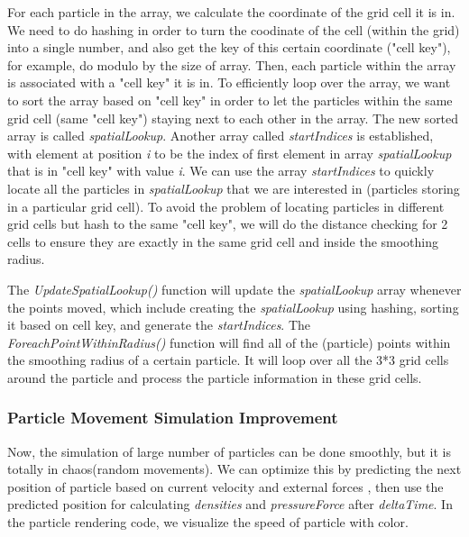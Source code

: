 \documentclass{article}
\begin{document}
For each particle in the array, we calculate the coordinate of the grid cell it is in. We need to do hashing in order to turn the coodinate of the cell (within the grid) into a single number, and also get the key of this certain coordinate ("cell key"), for example, do modulo by the size of array. Then, each particle within the array is associated with a "cell key" it is in. To efficiently loop over the array, we want to sort the array based on "cell key" in order to let the particles within the same grid cell (same "cell key") staying next to each other in the array. The new sorted array is called \textit{spatialLookup}. Another array called \textit{startIndices} is established, with element at position \textit{i} to be the index of first element in array \textit{spatialLookup} that is in "cell key" with value \textit{i}. We can use the array \textit{startIndices} to quickly locate all the particles in \textit{spatialLookup} that we are interested in (particles storing in a particular grid cell). To avoid the problem of locating particles in different grid cells but hash to the same "cell key", we will do the distance checking for 2 cells to ensure they are exactly in the same grid cell and inside the smoothing radius.  

The \textit{UpdateSpatialLookup()} function will update the \textit{spatialLookup} array whenever the points moved, which include creating the \textit{spatialLookup} using hashing, sorting it based on cell key, and generate the \textit{startIndices}. The \textit{ForeachPointWithinRadius()} function will find all of the (particle) points within the smoothing radius of a certain particle. It will loop over all the 3*3 grid cells around the particle and process the particle information in these grid cells. 

\subsubsection{Particle Movement Simulation Improvement}

\hspace{1em} Now, the simulation of large number of particles can be done smoothly, but it is totally in chaos(random movements). We can optimize this by predicting the next position of particle based on current velocity and external forces , then use the predicted position for calculating \textit{densities} and \textit{pressureForce} after \textit{deltaTime}. In the particle rendering code, we visualize the speed of particle with color.
\end{document}
